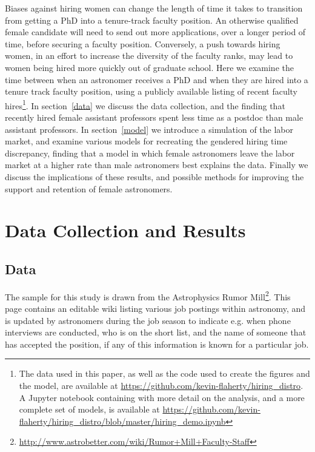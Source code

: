 \documentclass[modern]{aastex62}
\begin{document}
Biases against hiring women can change the length of time it takes to transition from getting a PhD into a tenure-track faculty position. An otherwise qualified female candidate will need to send out more applications, over a longer period of time, before securing a faculty position. Conversely, a push towards hiring women, in an effort to increase the diversity of the faculty ranks, may lead to women being hired more quickly out of graduate school. Here we examine the time between when an astronomer receives a PhD and when they are hired into a tenure track faculty position, using a publicly available listing of recent faculty hires\footnote{The data used in this paper, as well as the code used to create the figures and the model, are available at \url{https://github.com/kevin-flaherty/hiring_distro}. A Jupyter notebook containing with more detail on the analysis, and a more complete set of models, is available at \url{https://github.com/kevin-flaherty/hiring_distro/blob/master/hiring_demo.ipynb}}. In section~\ref{data} we discuss the data collection, and the finding that recently hired female assistant professors spent less time as a postdoc than male assistant professors. In section~\ref{model} we introduce a simulation of the labor market, and examine various models for recreating the gendered hiring time discrepancy, finding that a model in which female astronomers leave the labor market at a higher rate than male astronomers best explains the data. Finally we discuss the implications of these results, and possible methods for improving the support and retention of female astronomers. 

\section{Data Collection and Results\label{data}}

\subsection{Data}
The sample for this study is drawn from the Astrophysics Rumor Mill\footnote{\url{http://www.astrobetter.com/wiki/Rumor+Mill+Faculty-Staff}}. This page contains an editable wiki listing various job postings within astronomy, and is updated by astronomers during the job season to indicate e.g. when phone interviews are conducted, who is on the short list, and the name of someone that has accepted the position, if any of this information is known for a particular job. 
\end{document}
